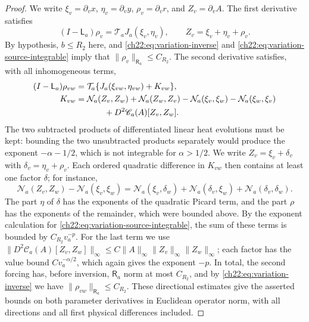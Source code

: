 \begin{proof}
We write $\xi_v=\partial_vx$, $\eta_v=\partial_vy$, $\rho_v=\partial_vr$, and $Z_v=\partial_vA$. The first derivative satisfies
\begin{equation}\label{ch22:eq:first-enhanced-variation}
 (I-\mathsf L_a)\rho_v=\mathcal T_aJ_a(\xi_v,\eta_v),\qquad Z_v=\xi_v+\eta_v+\rho_v .
\end{equation}
By hypothesis, $b\le R_2$ here, and \eqref{ch22:eq:variation-inverse} and \eqref{ch22:eq:variation-source-integrable} imply that $\|\rho_v\|_{\mathsf R_a}\le C_{R_2}$. The second derivative satisfies, with all inhomogeneous terms,
\begin{equation}\label{ch22:eq:second-enhanced-variation}
 \begin{split}
 (I-\mathsf L_a)\rho_{vw}&=\mathcal T_a\{J_a(\xi_{vw},\eta_{vw})+K_{vw}\},\\
 K_{vw}&=\mathcal N_a(Z_v,Z_w)+\mathcal N_a(Z_w,Z_v)-\mathcal N_a(\xi_v,\xi_w)-\mathcal N_a(\xi_w,\xi_v)\\
 &\hspace{12mm}+D^2\mathscr C_a(A)[Z_v,Z_w].
 \end{split}
\end{equation}
The two subtracted products of differentiated linear heat evolutions must be kept: bounding the two unsubtracted products separately would produce the exponent $-\alpha-1/2$, which is not integrable for $\alpha>1/2$. We write $Z_v=\xi_v+\delta_v$ with $\delta_v=\eta_v+\rho_v$. Each ordered quadratic difference in $K_{vw}$ then contains at least one factor $\delta$; for instance,
\[
 \mathcal N_a(Z_v,Z_w)-\mathcal N_a(\xi_v,\xi_w)=\mathcal N_a(\xi_v,\delta_w)+\mathcal N_a(\delta_v,\xi_w)+\mathcal N_a(\delta_v,\delta_w).
\]
The part $\eta$ of $\delta$ has the exponents of the quadratic Picard term, and the part $\rho$ has the exponents of the remainder, which were bounded above. By the exponent calculation for \eqref{ch22:eq:variation-source-integrable}, the sum of these terms is bounded by $C_{R_2}v_a^{-p}$. For the last term we use $\|D^2\mathscr C_a(A)[Z_v,Z_w]\|_\infty\le C\|A\|_\infty\|Z_v\|_\infty\|Z_w\|_\infty$; each factor has the value bound $Cv_a^{-\alpha/2}$, which again gives the exponent $-p$. In total, the second forcing has, before inversion, $\mathsf R_a$ norm at most $C_{R_2}$, and by \eqref{ch22:eq:variation-inverse} we have $\|\rho_{vw}\|_{\mathsf R_a}\le C_{R_2}$. These directional estimates give the asserted bounds on both parameter derivatives in Euclidean operator norm, with all directions and all first physical differences included.


\end{proof}
